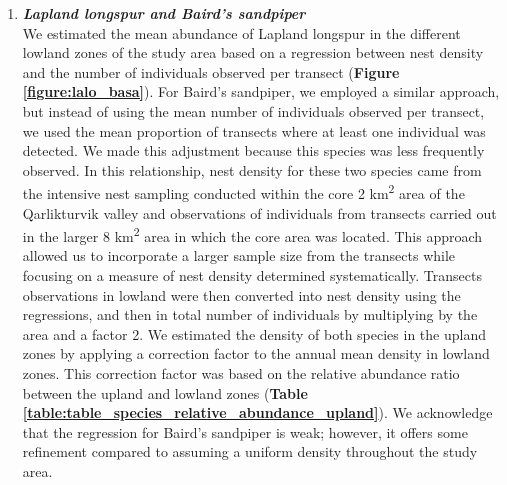 \documentclass[a4paper,twoside,12pt]{article}
\begin{document}
\begin{enumerate}[label=\alph*.]
                \item[] \textit{\textbf{Lapland longspur and Baird’s sandpiper}}\\
                We estimated the mean abundance of Lapland longspur in the different lowland zones of the study area based on a regression between nest density and the number of individuals observed per transect (\textbf{Figure \ref{figure:lalo_basa}}). For Baird’s sandpiper, we employed a similar approach, but instead of using the mean number of individuals observed per transect, we used the mean proportion of transects where at least one individual was detected. We made this adjustment because this species was less frequently observed. In this relationship, nest density for these two species came from the intensive nest sampling conducted within the core 2 km\textsuperscript{2} area of the Qarlikturvik valley and observations of individuals from transects carried out in the larger 8 km\textsuperscript{2} area in which the core area was located. This approach allowed us to incorporate a larger sample size from the transects while focusing on a measure of nest density determined systematically. Transects observations in lowland were then converted into nest density using the regressions, and then in total number of individuals by multiplying by the area and a factor 2. We estimated the density of both species in the upland zones by applying a correction factor to the annual mean density in lowland zones. This correction factor was based on the relative abundance ratio between the upland and lowland zones (\textbf{Table \ref{table:table_species_relative_abundance_upland}}). We acknowledge that the regression for Baird’s sandpiper is weak; however, it offers some refinement compared to assuming a uniform density throughout the study area. 
                

\end{enumerate}
\end{document}
